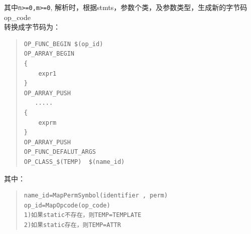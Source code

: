 \begin{enumerate}
\begin{quote}
\begin{verbatim}
\end{verbatim}
\end{quote}
其中\verb|n>=0,m>=0|, 解析时，根据stmts，参数个类，及参数类型，生成新的字节码 op\_code \\
转换成字节码为：
\begin{quote}
\begin{verbatim}
OP_FUNC_BEGIN $(op_id)
OP_ARRAY_BEGIN
{
    expr1
}
OP_ARRAY_PUSH
   .....
{
    exprm
}
OP_ARRAY_PUSH
OP_FUNC_DEFALUT_ARGS
OP_CLASS_$(TEMP)  $(name_id)
\end{verbatim}
\end{quote}
其中：
\begin{quote}
\begin{verbatim}
name_id=MapPermSymbol(identifier , perm)
op_id=MapOpcode(op_code) 
1)如果static不存在，则TEMP=TEMPLATE
2)如果static存在，则TEMP=ATTR
\end{verbatim}
\end{quote}
\end{enumerate}

